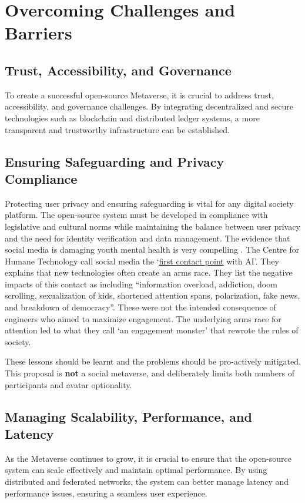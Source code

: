 

\section{Overcoming Challenges and Barriers}
\subsection{Trust, Accessibility, and Governance}
To create a successful open-source Metaverse, it is crucial to address trust, accessibility, and governance challenges. By integrating decentralized and secure technologies such as blockchain and distributed ledger systems, a more transparent and trustworthy infrastructure can be established.

\subsection{Ensuring Safeguarding and Privacy Compliance}
Protecting user privacy and ensuring safeguarding is vital for any digital society platform. The open-source system must be developed in compliance with legislative and cultural norms while maintaining the balance between user privacy and the need for identity verification and data management. The evidence that social media is damaging youth mental health is very compelling \cite{haidt2023social}. The Centre for Humane Technology call social media the `\href{https://www.youtube.com/watch?v=xoVJKj8lcNQ}{first contact point} with AI'. They explains that new technologies often create an arms race. They list the negative impacts of this contact as including ``information overload, addiction, doom scrolling, sexualization of kids, shortened attention spans, polarization, fake news, and breakdown of democracy''. These were not the intended consequence of engineers who aimed to maximize engagement.
The underlying arms race for attention led to what they call `an engagement monster' that rewrote the rules of society.\par
These lessons should be learnt and the problems should be pro-actively mitigated. This proposal is \textbf{not} a social metaverse, and deliberately limits both numbers of participants and avatar optionality.

\subsection{Managing Scalability, Performance, and Latency}
As the Metaverse continues to grow, it is crucial to ensure that the open-source system can scale effectively and maintain optimal performance. By using distributed and federated networks, the system can better manage latency and performance issues, ensuring a seamless user experience.

